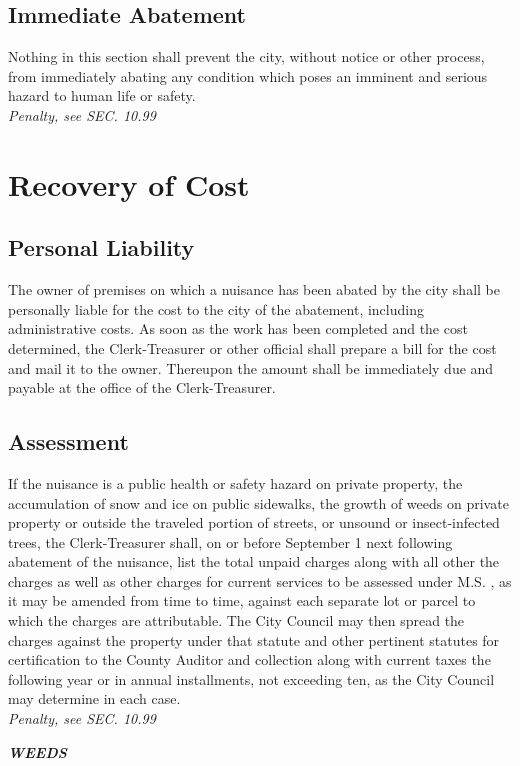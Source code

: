 \subsection{Immediate Abatement}
Nothing in this section shall prevent the city, without notice or other process, from immediately abating any condition which poses an imminent and serious hazard to human life or safety.\\
\emph{Penalty, see SEC. 10.99}
\section{Recovery of Cost}
\subsection{Personal Liability}
The owner of premises on which a nuisance has been abated by the city shall be personally liable for the cost to the city of the abatement, including administrative costs.  As soon as the work has been completed and the cost determined, the Clerk-Treasurer or other official shall prepare a bill for the cost and mail it to the owner.  Thereupon the amount shall be immediately due and payable at the office of the Clerk-Treasurer.
\subsection{Assessment}
If the nuisance is a public health or safety hazard on private property, the accumulation of snow and ice on public sidewalks, the growth of weeds on private property or outside the traveled portion of streets, or unsound or insect-infected trees, the Clerk-Treasurer shall, on or before September 1 next following abatement of the nuisance, list the total unpaid charges along with all other the charges as well as other charges for current services to be assessed under M.S. , as it may be amended from time to time, against each separate lot or parcel to which the charges are attributable.  The City Council may then spread the charges against the property under that statute and other pertinent statutes for certification to the County Auditor and collection along with current taxes the following year or in annual installments, not exceeding ten, as the City Council may determine in each case.\\
\emph{Penalty, see SEC. 10.99}

\begin{center}
\emph{\textbf{\LARGE{WEEDS}}}
\end{center}
\setcounter{section}{34}

